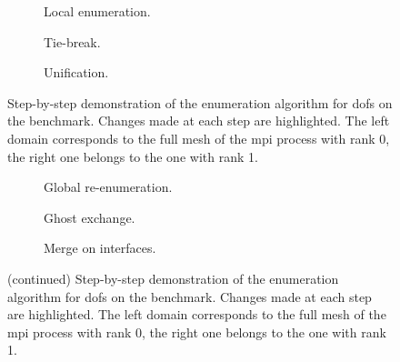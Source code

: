 {%
\let\oldthesubfigure\thesubfigure
\renewcommand{\thesubfigure}{Phase \arabic{subfigure}}

\def\Length{1}
\def\Radius{0.03}

\begin{figure}
\centering
\begin{subfigure}{\textwidth}
  \resizebox{\textwidth}{!}{
    
    \hfill{}
    
  }
  \caption{Local enumeration.}
\end{subfigure}
\begin{subfigure}{\textwidth}
  \resizebox{\textwidth}{!}{
    
    \hfill{}
    
  }
  \caption{Tie-break.}
\end{subfigure}
\begin{subfigure}{\textwidth}
  \resizebox{\textwidth}{!}{
    
    \hfill{}
    
  }
  \caption{Unification.}
\end{subfigure}
\caption[Step-by-step demonstration of the enumeration algorithm for  on the benchmark.]{Step-by-step demonstration of the enumeration algorithm for \glspl{dof} on the benchmark. Changes made at each step are highlighted. The left domain corresponds to the full mesh of the \gls{mpi} process with rank 0, the right one belongs to the one with rank 1.}
\label{fig:enumdemosteps}
\end{figure}

\begin{figure}
\ContinuedFloat
\begin{subfigure}{\textwidth}
  \resizebox{\textwidth}{!}{
    
    \hfill{}
    
  }
  \caption{Global re-enumeration.}
\end{subfigure}
\begin{subfigure}{\textwidth}
  \resizebox{\textwidth}{!}{
    
    \hfill{}
    
  }
  \caption{Ghost exchange.}
\end{subfigure}
\begin{subfigure}{\textwidth}
  \resizebox{\textwidth}{!}{
    
    \hfill{}
    
  }
  \caption{Merge on interfaces.}
\end{subfigure}
\caption[]{(continued) Step-by-step demonstration of the enumeration algorithm for \glspl{dof} on the benchmark. Changes made at each step are highlighted. The left domain corresponds to the full mesh of the \gls{mpi} process with rank 0, the right one belongs to the one with rank 1.}
\end{figure}

\renewcommand{\thesubfigure}{\oldthesubfigure}
}
